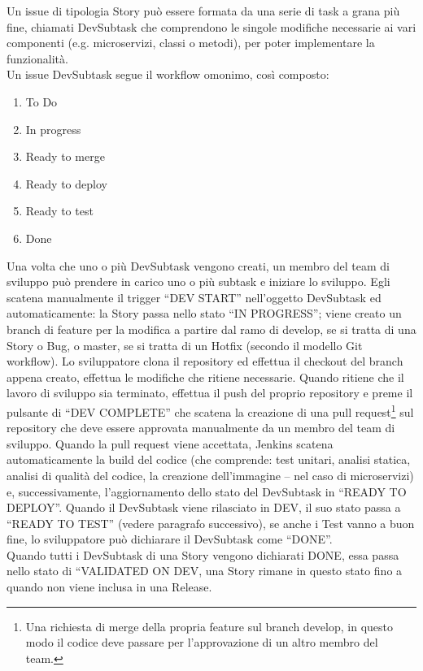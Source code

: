 \documentclass[a4paper, 12pt]{report}
\numberwithin{equation}{section}
\begin{document}
Un issue di tipologia Story può essere formata da una serie di task a grana più fine, chiamati DevSubtask che comprendono le singole modifiche necessarie ai vari componenti (e.g. microservizi, classi o metodi), per poter implementare la funzionalità.\\
Un issue DevSubtask segue il workflow omonimo, così composto:
\begin{enumerate}
    \item To Do
    \item In progress
    \item Ready to merge
    \item Ready to deploy
    \item Ready to test
    \item Done
\end{enumerate}
Una volta che uno o più DevSubtask vengono creati, un membro del team di sviluppo può prendere in carico uno o più subtask e iniziare lo sviluppo. Egli scatena manualmente il trigger “DEV START” nell’oggetto DevSubtask ed automaticamente: la Story passa nello stato “IN PROGRESS”; viene creato un branch di feature per la modifica a partire dal ramo di develop, se si tratta di una Story o Bug, o master, se si tratta di un Hotfix (secondo il modello Git workflow). Lo sviluppatore clona il repository ed effettua il checkout del branch appena creato, effettua le modifiche che ritiene necessarie. Quando ritiene che il lavoro di sviluppo sia terminato, effettua il push del proprio repository e preme il pulsante di “DEV COMPLETE” che scatena la creazione di una pull request\footnote{Una richiesta di merge della propria feature sul branch develop, in questo modo il codice deve passare per l’approvazione di un altro membro del team.} sul repository che deve essere approvata manualmente da un membro del team di sviluppo. Quando la pull request viene accettata, Jenkins scatena automaticamente la build del codice (che comprende: test unitari, analisi statica, analisi di qualità del codice, la creazione dell’immagine – nel caso di microservizi) e, successivamente, l’aggiornamento dello stato del DevSubtask in “READY TO DEPLOY”. Quando il DevSubtask viene rilasciato in DEV, il suo stato passa a “READY TO TEST” (vedere paragrafo successivo), se anche i Test vanno a buon fine, lo sviluppatore può dichiarare il DevSubtask come “DONE”.\\
Quando tutti i DevSubtask di una Story vengono dichiarati DONE, essa passa nello stato di “VALIDATED ON DEV, una Story rimane in questo stato fino a quando non viene inclusa in una Release.
\end{document}
